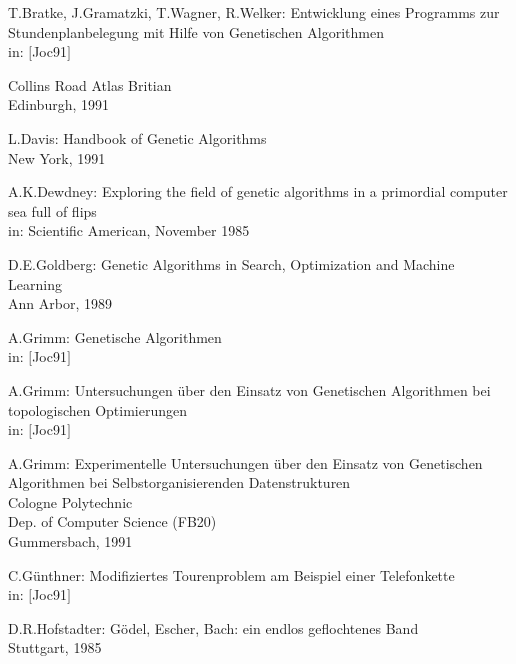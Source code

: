 \begin{thebibliography}{99}
T.Bratke, J.Gramatzki, T.Wagner, R.Welker: Entwicklung
                      eines Programms zur Stundenplanbelegung mit Hilfe von
                      Genetischen Algorithmen\\
                      in: $[$Joc91$]$

Collins Road Atlas Britian\\
                      Edinburgh, 1991

L.Davis: Handbook of Genetic Algorithms\\
                      New York, 1991

A.K.Dewdney: Exploring the field of genetic algorithms in a
                      primordial computer sea full of flips\\
                      in: Scientific American, November 1985

D.E.Goldberg: Genetic Algorithms in Search,
                      Optimization and Machine Learning\\
                      Ann Arbor, 1989

A.Grimm: Genetische Algorithmen\\
                      in: $[$Joc91$]$

A.Grimm: Untersuchungen \"uber den Einsatz von Genetischen 
                      Algorithmen bei topologischen Optimierungen\\
                      in: $[$Joc91$]$

A.Grimm: Experimentelle Untersuchungen \"uber den Einsatz
                      von Genetischen Algorithmen bei Selbstorganisierenden Datenstrukturen\\
                      Cologne Polytechnic\\
                      Dep. of Computer Science (FB20)\\
                      Gummersbach, 1991

C.G\"unthner: Modifiziertes Tourenproblem am Beispiel einer 
                      Telefonkette\\
                      in: $[$Joc91$]$

D.R.Hofstadter: G\"odel, Escher, Bach: ein endlos geflochtenes 
                      Band\\
                      Stuttgart, 1985


\end{thebibliography}
